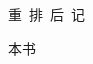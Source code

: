 \setcounter{page}{1}
\pagestyle{plain}
\begin{center}
    \xbsong 重~排~后~记
\end{center}
\fangsong

本书
